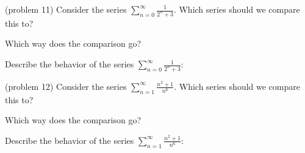\documentclass[handout]{ximera}
\begin{document}
\begin{problem}(problem 11)
Consider the series $\displaystyle{\sum_{n=0}^\infty \frac{1}{2^n + 3}}$.
Which series should we compare this to?

\begin{multipleChoice}
\end{multipleChoice}

Which way does the comparison go?
\begin{multipleChoice}
\end{multipleChoice}

Describe the behavior of the series $\sum_{n=0}^\infty \frac{1}{2^n + 3}:$
\begin{multipleChoice}
\end{multipleChoice}

\end{problem}





\begin{problem}(problem 12)
Consider the series $\displaystyle{\sum_{n=1}^\infty \frac{n^2 +1}{n^6}}$.
Which series should we compare this to?

\begin{multipleChoice}
\end{multipleChoice}

Which way does the comparison go?
\begin{multipleChoice}
\end{multipleChoice}

Describe the behavior of the series $\sum_{n=1}^\infty \frac{n^2+1}{n^6}:$
\begin{multipleChoice}
\end{multipleChoice}

\end{problem}
\end{document}

